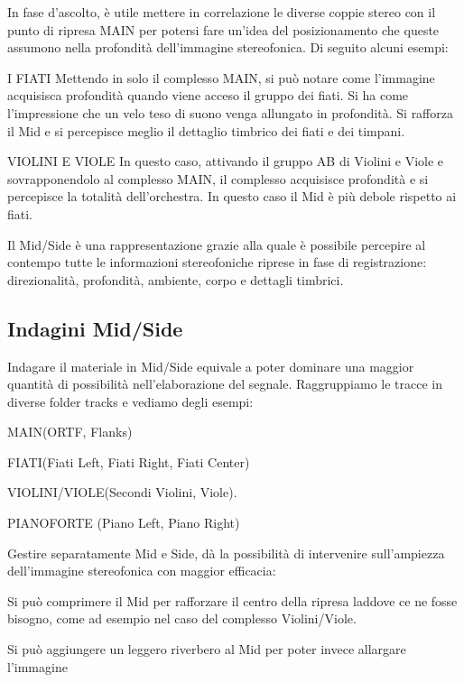 	In fase d'ascolto, è utile mettere in correlazione le diverse coppie stereo con il punto di ripresa MAIN per potersi fare un'idea del posizionamento che  queste assumono nella profondità dell'immagine stereofonica.
	Di seguito alcuni esempi:
	\begin{compactitem} 
		\item [I FIATI] Mettendo in solo il complesso MAIN, si può notare come l'immagine acquisisca profondità quando viene acceso il gruppo dei fiati. Si ha come l'impressione che un velo teso di suono venga allungato in profondità. Si rafforza il Mid e si percepisce meglio il dettaglio timbrico dei fiati e dei timpani.
		\item [VIOLINI E VIOLE] In questo caso, attivando il gruppo AB di Violini e Viole e sovrapponendolo al complesso MAIN, il complesso acquisisce profondità e si percepisce la totalità dell'orchestra. In questo caso il Mid è più debole rispetto ai fiati.
	\end{compactitem}
	Il Mid/Side è una rappresentazione grazie alla quale è possibile percepire al contempo tutte le informazioni stereofoniche riprese in fase di registrazione: direzionalità, profondità, ambiente, corpo e dettagli timbrici.
	
	\subsection*{Indagini Mid/Side}
	Indagare il materiale in Mid/Side equivale a poter dominare una maggior quantità di possibilità nell'elaborazione del segnale.
	Raggruppiamo le tracce in diverse folder tracks e vediamo degli esempi:
	\begin{compactitem} 
		\item MAIN(ORTF, Flanks)
		\item FIATI(Fiati Left, Fiati Right, Fiati Center)
		\item VIOLINI/VIOLE(Secondi Violini, Viole).
		\item PIANOFORTE (Piano Left, Piano Right)
	\end{compactitem}
	Gestire separatamente Mid e Side, dà la possibilità di intervenire sull'ampiezza dell'immagine stereofonica con maggior efficacia:
	\begin{compactitem}
		\item Si può comprimere il Mid per rafforzare il centro della ripresa laddove ce ne fosse bisogno, come ad esempio nel caso del complesso Violini/Viole.
		\item Si può aggiungere un leggero riverbero al Mid per poter invece allargare  l'immagine
	\end{compactitem}
	
